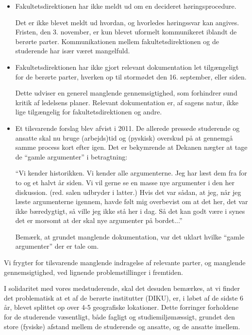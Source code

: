 \documentclass[a4paper]{article}
\begin{document}
\begin{itemize}



\item Fakultetsdirektionen har ikke meldt ud om en decideret høringsprocedure.

Det er ikke blevet meldt ud hvordan, og hvorledes høringssvar kan angives.
Fristen, den 3.  november, er kun blevet uformelt kommunikeret iblandt de
berørte parter. Kommunikationen mellem fakultetsdirektionen og de studerende
har især været mangelfuld.

\item Fakultetsdirektionen har ikke gjort relevant dokumentation let
tilgængeligt for de berørte parter, hverken op til stormødet den 16.
september, eller siden.

Dette udviser en generel manglende gennemsigtighed, som forhindrer sund kritik
af ledelsens planer. Relevant dokumentation er, af sagens natur, ikke lige
tilgængelig for fakultetsdirektionen og andre.

\item Et tilsvarende forslag blev afvist i 2011. De allerede pressede
studerende og ansatte skal nu bruge (arbejds)tid og (pyskisk) overskud på at
gennemgå samme process kort efter igen. Det er bekymrende at Dekanen nægter at
tage de ``gamle argumenter'' i betragtning:

``Vi kender historikken. Vi kender alle argumenterne. Jeg har læst dem fra for
to og et halvt år siden. Vi vil gerne se en masse nye argumenter i den her
diskussion. (red. salen udbryder i latter.) Hvis det var sådan, at jeg, når jeg
læste argumenterne igennem, havde følt mig overbevist om at det her, det var
ikke bæredygtigt, så ville jeg ikke stå her i dag. Så det kan godt være i synes
det er morsomt at der skal nye argumenter på bordet...''\cite{stormoede} 

Bemærk, at grundet manglende dokumentation, var det uklart hvilke ``gamle
argumenter'' der er tale om.

\end{itemize}

Vi frygter for tilsvarende manglende indragelse af relevante parter, og
manglende gennemsigtighed, ved lignende problemstillinger i fremtiden.

I solidaritet med vores medstuderende, skal det desuden bemærkes, at vi finder
det problematisk at et af de berørte institutter (DIKU), er, i løbet af de
sidste 6 år, blevet splittet op over 4-5 geografiske lokationer. Dette
forringer forholdene for de studerende væsentligt, både fagligt og
studiemiljømæssigt, grundet den store (fysiske) afstand mellem de studerende og
ansatte, og de ansatte imellem.
\end{document}
